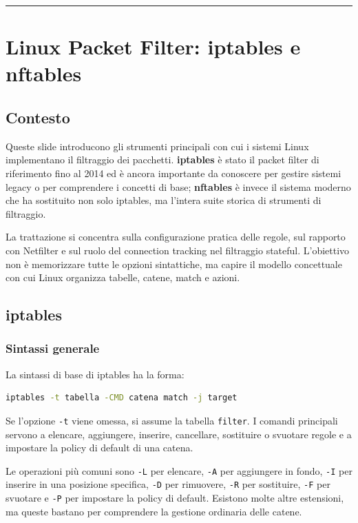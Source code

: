 \documentclass[12pt, a4paper]{report}
\begin{document}
\noindent\rule{\textwidth}{0.4pt}

\section{Linux Packet Filter: iptables e nftables}

\subsection{Contesto}
Queste slide introducono gli strumenti principali con cui i sistemi Linux implementano il filtraggio dei pacchetti. \textbf{iptables} è stato il packet filter di riferimento fino al 2014 ed è ancora importante da conoscere per gestire sistemi legacy o per comprendere i concetti di base; \textbf{nftables} è invece il sistema moderno che ha sostituito non solo iptables, ma l'intera suite storica di strumenti di filtraggio.

La trattazione si concentra sulla configurazione pratica delle regole, sul rapporto con Netfilter e sul ruolo del connection tracking nel filtraggio stateful. L'obiettivo non è memorizzare tutte le opzioni sintattiche, ma capire il modello concettuale con cui Linux organizza tabelle, catene, match e azioni.

\subsection{iptables}

\subsubsection{Sintassi generale}
La sintassi di base di iptables ha la forma:
\begin{lstlisting}[language=bash]
	iptables -t tabella -CMD catena match -j target
\end{lstlisting}

Se l'opzione \texttt{-t} viene omessa, si assume la tabella \texttt{filter}. I comandi principali servono a elencare, aggiungere, inserire, cancellare, sostituire o svuotare regole e a impostare la policy di default di una catena.

Le operazioni più comuni sono \texttt{-L} per elencare, \texttt{-A} per aggiungere in fondo, \texttt{-I} per inserire in una posizione specifica, \texttt{-D} per rimuovere, \texttt{-R} per sostituire, \texttt{-F} per svuotare e \texttt{-P} per impostare la policy di default. Esistono molte altre estensioni, ma queste bastano per comprendere la gestione ordinaria delle catene.
\end{document}
